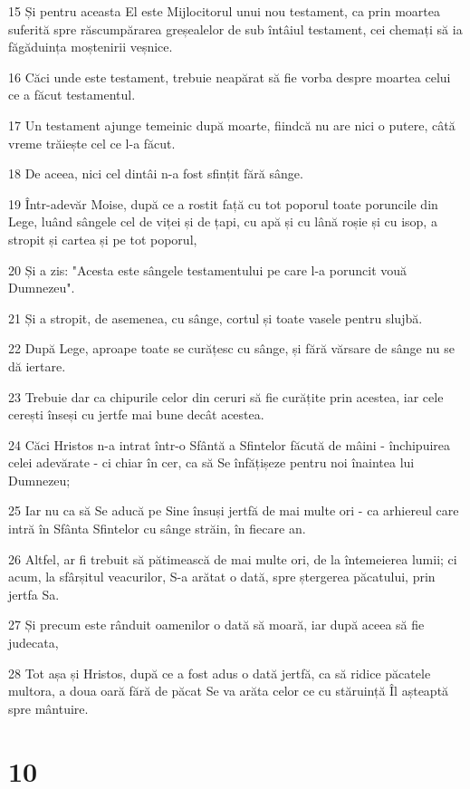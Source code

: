 \par 15 Și pentru aceasta El este Mijlocitorul unui nou testament, ca prin moartea suferită spre răscumpărarea greșealelor de sub întâiul testament, cei chemați să ia făgăduința moștenirii veșnice.
\par 16 Căci unde este testament, trebuie neapărat să fie vorba despre moartea celui ce a făcut testamentul.
\par 17 Un testament ajunge temeinic după moarte, fiindcă nu are nici o putere, câtă vreme trăiește cel ce l-a făcut.
\par 18 De aceea, nici cel dintâi n-a fost sfințit fără sânge.
\par 19 Într-adevăr Moise, după ce a rostit față cu tot poporul toate poruncile din Lege, luând sângele cel de viței și de țapi, cu apă și cu lână roșie și cu isop, a stropit și cartea și pe tot poporul,
\par 20 Și a zis: "Acesta este sângele testamentului pe care l-a poruncit vouă Dumnezeu".
\par 21 Și a stropit, de asemenea, cu sânge, cortul și toate vasele pentru slujbă.
\par 22 După Lege, aproape toate se curățesc cu sânge, și fără vărsare de sânge nu se dă iertare.
\par 23 Trebuie dar ca chipurile celor din ceruri să fie curățite prin acestea, iar cele cerești înseși cu jertfe mai bune decât acestea.
\par 24 Căci Hristos n-a intrat într-o Sfântă a Sfintelor făcută de mâini - închipuirea celei adevărate - ci chiar în cer, ca să Se înfățișeze pentru noi înaintea lui Dumnezeu;
\par 25 Iar nu ca să Se aducă pe Sine însuși jertfă de mai multe ori - ca arhiereul care intră în Sfânta Sfintelor cu sânge străin, în fiecare an.
\par 26 Altfel, ar fi trebuit să pătimească de mai multe ori, de la întemeierea lumii; ci acum, la sfârșitul veacurilor, S-a arătat o dată, spre ștergerea păcatului, prin jertfa Sa.
\par 27 Și precum este rânduit oamenilor o dată să moară, iar după aceea să fie judecata,
\par 28 Tot așa și Hristos, după ce a fost adus o dată jertfă, ca să ridice păcatele multora, a doua oară fără de păcat Se va arăta celor ce cu stăruință Îl așteaptă spre mântuire.

\chapter{10}

